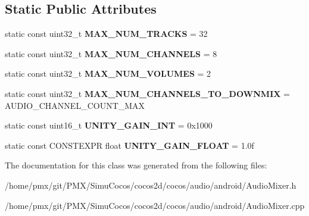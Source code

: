 \subsection*{Static Public Attributes}
\begin{DoxyCompactItemize}
\item 
\mbox{\label{classcocos2d_1_1experimental_1_1AudioMixer_a3d1ab5adc485b94c477d1a5b571f3d1b}} 
static const uint32\+\_\+t {\bfseries M\+A\+X\+\_\+\+N\+U\+M\+\_\+\+T\+R\+A\+C\+KS} = 32
\item 
\mbox{\label{classcocos2d_1_1experimental_1_1AudioMixer_ad86ac5569e01bf858700a88535d965a3}} 
static const uint32\+\_\+t {\bfseries M\+A\+X\+\_\+\+N\+U\+M\+\_\+\+C\+H\+A\+N\+N\+E\+LS} = 8
\item 
\mbox{\label{classcocos2d_1_1experimental_1_1AudioMixer_a6eb5e62a574f563d8d77c018f0f22f35}} 
static const uint32\+\_\+t {\bfseries M\+A\+X\+\_\+\+N\+U\+M\+\_\+\+V\+O\+L\+U\+M\+ES} = 2
\item 
\mbox{\label{classcocos2d_1_1experimental_1_1AudioMixer_abce70a115297fe6a280258ddac51a02d}} 
static const uint32\+\_\+t {\bfseries M\+A\+X\+\_\+\+N\+U\+M\+\_\+\+C\+H\+A\+N\+N\+E\+L\+S\+\_\+\+T\+O\+\_\+\+D\+O\+W\+N\+M\+IX} = A\+U\+D\+I\+O\+\_\+\+C\+H\+A\+N\+N\+E\+L\+\_\+\+C\+O\+U\+N\+T\+\_\+\+M\+AX
\item 
\mbox{\label{classcocos2d_1_1experimental_1_1AudioMixer_aed61f4c92e454c9c6897887eb925c379}} 
static const uint16\+\_\+t {\bfseries U\+N\+I\+T\+Y\+\_\+\+G\+A\+I\+N\+\_\+\+I\+NT} = 0x1000
\item 
\mbox{\label{classcocos2d_1_1experimental_1_1AudioMixer_a2eb8f62dcf4510176b2c55d7a9c27552}} 
static const C\+O\+N\+S\+T\+E\+X\+PR float {\bfseries U\+N\+I\+T\+Y\+\_\+\+G\+A\+I\+N\+\_\+\+F\+L\+O\+AT} = 1.\+0f
\end{DoxyCompactItemize}


The documentation for this class was generated from the following files\+:\begin{DoxyCompactItemize}
\item 
/home/pmx/git/\+P\+M\+X/\+Simu\+Cocos/cocos2d/cocos/audio/android/Audio\+Mixer.\+h\item 
/home/pmx/git/\+P\+M\+X/\+Simu\+Cocos/cocos2d/cocos/audio/android/Audio\+Mixer.\+cpp\end{DoxyCompactItemize}
